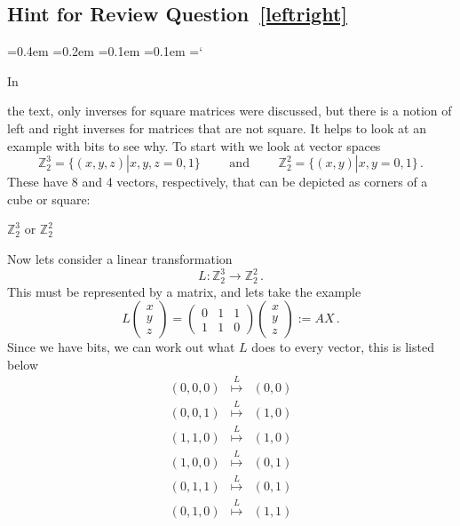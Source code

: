 
\subsection*{Hint for Review Question~\ref{leftright}}

{\ttfamily
{}\font=0.4em
\font=0.2em
\font=0.1em
\font=0.1em
\hyphenchar\font=`\-


\hypertarget{inverse_matrix_hint}{In} 
the text, only inverses for square matrices were discussed, but there is a notion of left and right inverses for matrices that are not square.
It helps to look at an example with bits to see why.
To start with we look at vector spaces
\[{\mathbb Z}_2^3=\{(x,y,z)|x,y,z=0,1\}\qquad \mbox{ and } \qquad {\mathbb Z}_2^2=\{(x,y)|x,y=0,1\}\, .\]
These have 8 and 4 vectors, respectively, that can be depicted as corners of a cube or square:
\begin{center}
${\mathbb Z}_2^3$ \hspace{4mm} or ${\mathbb Z}_2^2$
\end{center}
Now lets consider a linear transformation
\[
L:{\mathbb Z}_2^3\longrightarrow{\mathbb Z}_2^2\, .
\]
This must be represented by a matrix, and lets take the example
\[
L\begin{pmatrix}x\\y\\z\end{pmatrix}=\begin{pmatrix}0 & 1 & 1\\1 & 1 &0\end{pmatrix}\begin{pmatrix}x\\y\\z\end{pmatrix}:=A X\, .
\]
Since we have bits, we can work out what $L$ does to every vector, this is listed below
\[
\begin{array}{ccc}
(0,0,0)&\stackrel{L}\mapsto&(0,0)\\[2mm]
(0,0,1)&\stackrel{L}\mapsto&(1,0)\\
(1,1,0)&\stackrel{L}\mapsto&(1,0)\\[2mm]
(1,0,0)&\stackrel{L}\mapsto&(0,1)\\
(0,1,1)&\stackrel{L}\mapsto&(0,1)\\[2mm]
(0,1,0)&\stackrel{L}\mapsto&(1,1)\\

\end{array}\]}
